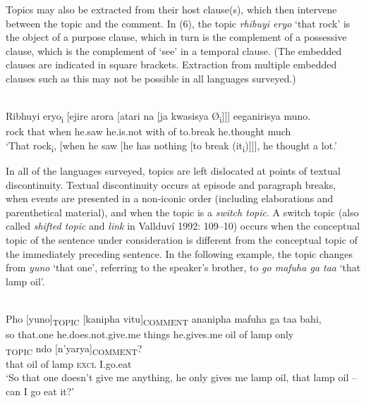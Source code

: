\documentclass[output=paper]{langsci/langscibook}
\begin{document}
Topics may also be extracted from their host clause(s), which then intervene between the topic and the comment. In (6), the topic \textit{rhibuyi eryo} ‘that rock’ is the object of a purpose clause, which in turn is the complement of a possessive clause, which is the complement of ‘see’ in a temporal clause. (The embedded clauses are indicated in square brackets. Extraction from multiple embedded clauses such as this may not be possible in all languages surveyed.)

\ea\label{ex:}
\\
\gll Ribhuyi eryo\textsubscript{i} [ejire arora [atari na [ja kwasisya Ø\textsubscript{i}]]] eeganirisya muno.\\
rock that when he.saw he.is.not with of to.break he.thought much\\

\glt \textup{‘}\textup{That rock}\textsubscript{i}\textup{, [when he saw [he has nothing [to break (it}\textsubscript{i}\textup{)]]], he thought a}\textup{ lot.’}
\z

In all of the languages surveyed, topics are left dislocated at points of textual discontinuity. Textual discontinuity occurs at episode and paragraph breaks, when events are presented in a non-iconic order (including elaborations and parenthetical material), and when the topic is a \textit{switch topic}. A switch topic (also called \textit{shifted topic} and \textit{link} in Vallduví 1992: 109–10) occurs when the conceptual topic of the sentence under consideration is different from the conceptual topic of the immediately preceding sentence. In the following example, the topic changes from \textit{yuno} ‘that one’, referring to the speaker’s brother, to \textit{go mafuha ga taa} ‘that lamp oil’.

\ea\label{ex:}
\\
\gll Pho [yuno]\textsubscript{TOPIC} [kanipha vitu]\textsubscript{COMMENT}\textsubscript{ }ananipha mafuha ga taa bahi,\\
so that.one he.does.not.give.me things he.gives.me oil of lamp only\\


\textsubscript{TOPIC} ndo [n’yarya]\textsubscript{COMMENT}?\\
that oil of lamp \textsc{excl} I.go.eat\\

\glt \textup{‘So t}\textup{hat one doesn’t give me anything, he only gives me lamp oil, that lamp oil – can I g}\textup{o eat it?’}
\z
\end{document}
